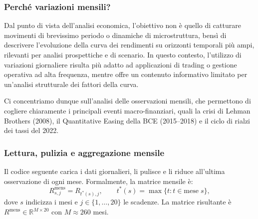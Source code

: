 \documentclass[11pt,a4paper]{article}
\theoremstyle{plain}
\theoremstyle{definition}
\theoremstyle{remark}
\begin{document}
\subsubsection{Perché variazioni mensili?}
\label{sec:motivazione-mensile}

Dal punto di vista dell'analisi economica, l'obiettivo non è quello di catturare movimenti
di brevissimo periodo o dinamiche di microstruttura, bensì di descrivere l'evoluzione della
curva dei rendimenti su orizzonti temporali più ampi, rilevanti per analisi prospettiche e
di scenario. In questo contesto, l'utilizzo di variazioni giornaliere risulta più adatto ad
applicazioni di trading o gestione operativa ad alta frequenza, mentre offre un contenuto
informativo limitato per un'analisi strutturale dei fattori della curva.

Ci concentriamo dunque sull'analisi delle osservazioni mensili, che permettono di cogliere chiaramente i principali eventi
macro-finanziari, quali la crisi di Lehman Brothers (2008), il Quantitative Easing
della BCE (2015--2018) e il ciclo di rialzi dei tassi del 2022.

\subsubsection{Lettura, pulizia e aggregazione mensile}
\label{sec:aggregazione}

Il codice seguente carica i dati giornalieri, li pulisce e li riduce all'ultima
osservazione di ogni mese. Formalmente, la matrice mensile è:
\[
R^{\text{mens}}_{s,j} = R_{t^*(s),j}, \qquad
t^*(s) = \max\{t : t \in \text{mese}\; s\},
\]
dove $s$ indicizza i mesi e $j \in \{1,\ldots,20\}$ le scadenze.
La matrice risultante è $R^{\text{mens}} \in \mathbb{R}^{M \times 20}$
con $M \approx 260$ mesi. 
\end{document}
